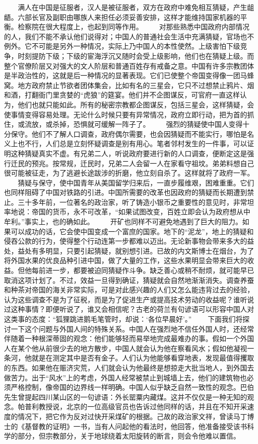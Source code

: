 \documentclass[12pt,oneside]{book}
\begin{document}
\begin{common-format}
　　满人在中国是征服者，汉人是被征服者，双方在政府中难免相互猜疑，产生龃龉。六部长官及副职由哪族人来担任必须妥善安排，这样才能维持国家机器的平衡。检察院在很大程度上，也起到同等作用。 
　　对那些熟悉中国政府内部情况的人，我们不能不承认他们说得对；中国人的普通社会生活中充满猜疑，官场也不例外。它不可能是另外一种情况，实际上乃中国人的本性使然。上级害怕下级竞争，时刻提防下级；下级的宦海浮沉又随时会受上级影响，他们也在猜疑上级。而整个官僚阶层又对强大的文人阶层和普通百姓存有戒备之意。中国有许多宗教团体是半政治性的，这就是后一种情况的显著表现。它们已使整个帝国变得像一团马蜂窝。地方政府禁止节欲者团体集会，比如有名的三星会，它只不过想禁止鸦片、烟和酒，打翻衙门里贪婪的“虎狼”的筵宴。他们并不企图谋反，可官府一直这样认为，他们也就只能如此。所有的秘密宗教都企图谋反，包括三星会，这样猜疑，会使事情变得容易处理。无论什么时候只要有异常情况，政府立即行动，把为首的抓住，或流放，或杀掉，恐惧就可缓解一阵子了。 
　　强烈的猜疑使中国人变得十分保守。他们不了解人口调查，政府偶尔需要，也会因猜疑而不能实行，哪怕是名义上也不行，人们总是立刻怀疑调查是别有用心。笔者邻村发生的一件事，可以证明这种猜疑真实不虚。有兄弟二人，听说政府要进行新的人口调查，便断定这是强行迁民的预兆。按常规，迁民时，兄弟二人会留一人在家看守祖坟。弟弟料想自己很可能被征走，为了逃避长途跋涉的折磨，他立刻自杀了。这样就将了政府一军。 
　　猜疑与保守，使中国青年从美国留学归来后，一直步履维艰，困难重重。它们也同样阻碍了中国对铁路的引进。中国所需要的改革也因政府的猜疑而长期遭到禁止。三十多年前，一位著名的政治家，听了铸造小银币之重要性的意见时，非常坦率地说：帝国的货币，永不可改革，“如果试图改变，百姓立即会认为政府想从中牟利。”事实上，也的确如此。 
　　开矿也同样不可避免地遇到了巨大的阻力。如果可以成功的话，它会使中国变成一个富庶的国家。地下的“泥龙”，地上的猜疑和侵吞公款的行为，使得整个行动连第一步都难以迈出。无论新事物会带来多大的益处，益处有多明显，只要引起猜疑，就别想引进。已故的内文斯博士在烟台，为了将外国水果的优良品种引进中国，做了大量的工作，这些水果明显会带来巨大的收益。但他每前进一步，都要被迫同猜疑作斗争。缺乏善心或稍不耐烦，就可能早已取消这项计划了。不过，效益一旦得到确证，猜疑就会自然地渐渐消失。调查养蚕和种茶对帝国的海关非常实际，可是对此感兴趣的人们又怎么能违背过去的经验，认为这些调查不是为了征税，而是为了促进生产或提高技术劳动的收益呢？谁听说过这种事情？即便听说了，谁又会相信呢？古老的荷兰有句谚语可以形容中国人对这类事的态度：“狐狸跳进鹅毛笔管时，却说：‘各位早晨好’。” 
　　下面我们将探讨一下这个问题与外国人间的特殊关系。中国人在强烈地不信任外国人时，还经常伴随着一种根深蒂固的观念：他们能够轻而易举地完成最难办的事。假如一个外国人在某个他从前很少去的地方散步，中国人就会认为他在察看风水；假如他凝视一条河，他就是在测定其中是否有金子。人们认为他能够看穿地表，发现最值得攫取的东西。如果他在赈济灾荒，人们就会认为他最终是想掠走大批当地人，到外国去做苦力。出于“风水”上的考虑，外国人经常被禁止到城墙上去，他们的建筑物也必须严格控制，像帝国的边界线一样明确。中国人似乎缺乏自然一致性的观念。巴伯先生曾提起四川某山区的一句谚语：外长罂粟内藏煤。这并不仅仅是一种无知的观念。帕普利教授说，北京的一位高级官员也告诉过他同样的话，并且在不知开采速度的情况下，把它作为反对过快开采煤矿的根据。己故的政治家文祥，曾读马丁博士的《基督教的证明》一书，当有人问起他的看法时，他回答，他准备接受该书科学的部分，但宗教部分，关于地球绕着太阳旋转的断言，则会令他难以置信。 

\end{common-format}
\end{document}
